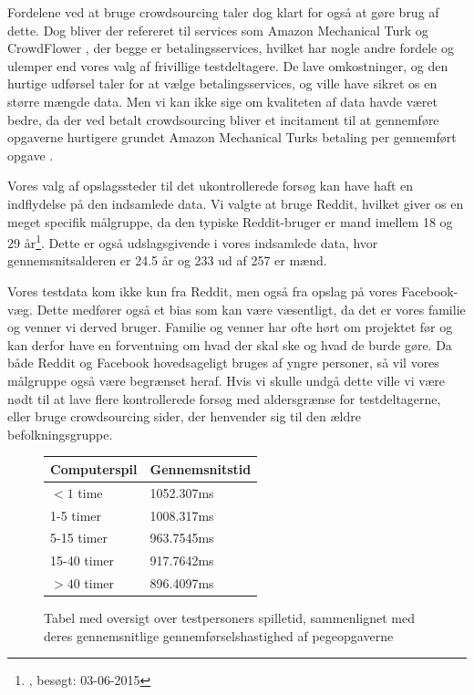 Fordelene ved at bruge crowdsourcing taler dog klart for også at gøre brug af dette. Dog bliver der refereret til services som Amazon Mechanical Turk og CrowdFlower \cite{liu2012crowdsourcing}, der begge er betalingsservices, hvilket har nogle andre fordele og ulemper end vores valg af frivillige testdeltagere. De lave omkostninger, og den hurtige udførsel taler for at vælge betalingsservices, og ville have sikret os en større mængde data. Men vi kan ikke sige om kvaliteten af data havde været bedre, da der ved betalt crowdsourcing bliver et incitament til at gennemføre opgaverne hurtigere grundet Amazon Mechanical Turks betaling per gennemført opgave \cite{liu2012crowdsourcing}.

Vores valg af opslagssteder til det ukontrollerede forsøg kan have haft en indflydelse på den indsamlede data. Vi valgte at bruge Reddit, hvilket giver os en meget specifik målgruppe, da den typiske Reddit-bruger er mand imellem 18 og 29 år\footnote{\href{http://www.pewinternet.org/2013/07/03/6-of-online-adults-are-reddit-users/}, besøgt: 03-06-2015}. Dette er også udslagsgivende i vores indsamlede data, hvor gennemsnitsalderen er 24.5 år og 233 ud af 257 er mænd.

Vores testdata kom ikke kun fra Reddit, men også fra opslag på vores Facebook-væg. Dette medfører også et bias som kan være væsentligt, da det er vores familie og venner vi derved bruger. Familie og venner har ofte hørt om projektet før og kan derfor have en forventning om hvad der skal ske og hvad de burde gøre. Da både Reddit og Facebook hovedsageligt bruges af yngre personer, så vil vores målgruppe også være begrænset heraf. Hvis vi skulle undgå dette ville vi være nødt til at lave flere kontrollerede forsøg med aldersgrænse for testdeltagerne, eller bruge crowdsourcing sider, der henvender sig til den ældre befolkningsgruppe.

\begin{figure}
	\centering
	\begin{tabular}{ll}
		\textbf{Computerspil} & \textbf{Gennemsnitstid}\\\hline
		$<1$ time    & 1052.307ms\\
		1-5 timer    & 1008.317ms\\
		5-15 timer   & 963.7545ms\\
		15-40 timer  & 917.7642ms\\
		$>40$ timer  & 896.4097ms\\
	\end{tabular}
	\caption{Tabel med oversigt over testpersoners spilletid, sammenlignet med deres gennemsnitlige gennemførselshastighed af pegeopgaverne}
	\label{tab:times_average}
\end{figure}

